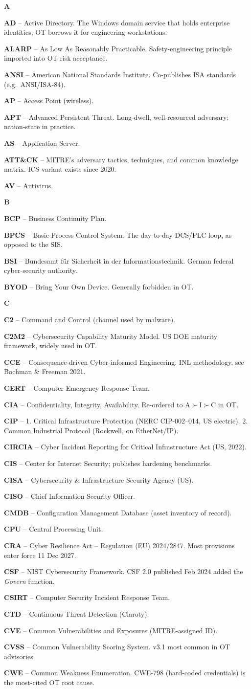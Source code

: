 \documentclass[10pt,a4paper,twocolumn]{article}
\newcommand{\ac}[2]{%
  \noindent\textcolor{slideBlue}{\textbf{#1}}\,\,--\,\,\small #2\par\vspace{0.6mm}%
}
\newcommand{\letterhead}[1]{%
  \par\vspace{1.5mm}%
  \noindent\colorbox{slidePanel}{\parbox{\dimexpr\columnwidth-2\fboxsep}{%
    \textcolor{slideBlue}{\textbf{\large #1}}}}\par\vspace{0.8mm}%
}
\begin{document}

\letterhead{A}
\ac{AD}{Active Directory. The Windows domain service that holds enterprise identities; OT borrows it for engineering workstations.}
\ac{ALARP}{As Low As Reasonably Practicable. Safety-engineering principle imported into OT risk acceptance.}
\ac{ANSI}{American National Standards Institute. Co-publishes ISA standards (e.g.\ ANSI/ISA-84).}
\ac{AP}{Access Point (wireless).}
\ac{APT}{Advanced Persistent Threat. Long-dwell, well-resourced adversary; nation-state in practice.}
\ac{AS}{Application Server.}
\ac{ATT\&CK}{MITRE's adversary tactics, techniques, and common knowledge matrix. ICS variant exists since 2020.}
\ac{AV}{Antivirus.}

\letterhead{B}
\ac{BCP}{Business Continuity Plan.}
\ac{BPCS}{Basic Process Control System. The day-to-day DCS/PLC loop, as opposed to the SIS.}
\ac{BSI}{Bundesamt f\"ur Sicherheit in der Informationstechnik. German federal cyber-security authority.}
\ac{BYOD}{Bring Your Own Device. Generally forbidden in OT.}

\letterhead{C}
\ac{C2}{Command and Control (channel used by malware).}
\ac{C2M2}{Cybersecurity Capability Maturity Model. US DOE maturity framework, widely used in OT.}
\ac{CCE}{Consequence-driven Cyber-informed Engineering. INL methodology, see Bochman \& Freeman 2021.}
\ac{CERT}{Computer Emergency Response Team.}
\ac{CIA}{Confidentiality, Integrity, Availability. Re-ordered to A$\succ$I$\succ$C in OT.}
\ac{CIP}{1. Critical Infrastructure Protection (NERC CIP-002--014, US electric). 2. Common Industrial Protocol (Rockwell, on EtherNet/IP).}
\ac{CIRCIA}{Cyber Incident Reporting for Critical Infrastructure Act (US, 2022).}
\ac{CIS}{Center for Internet Security; publishes hardening benchmarks.}
\ac{CISA}{Cybersecurity \& Infrastructure Security Agency (US).}
\ac{CISO}{Chief Information Security Officer.}
\ac{CMDB}{Configuration Management Database (asset inventory of record).}
\ac{CPU}{Central Processing Unit.}
\ac{CRA}{Cyber Resilience Act -- Regulation (EU) 2024/2847. Most provisions enter force 11 Dec 2027.}
\ac{CSF}{NIST Cybersecurity Framework. CSF 2.0 published Feb 2024 added the \emph{Govern} function.}
\ac{CSIRT}{Computer Security Incident Response Team.}
\ac{CTD}{Continuous Threat Detection (Claroty).}
\ac{CVE}{Common Vulnerabilities and Exposures (MITRE-assigned ID).}
\ac{CVSS}{Common Vulnerability Scoring System. v3.1 most common in OT advisories.}
\ac{CWE}{Common Weakness Enumeration. CWE-798 (hard-coded credentials) is the most-cited OT root cause.}
\end{document}
